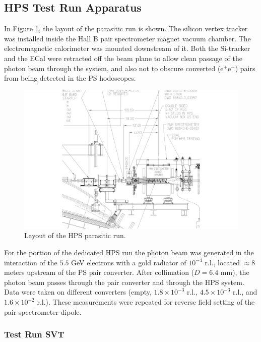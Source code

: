\subsection{HPS Test Run Apparatus } 

In Figure \ref{fig:hpstest_layout}, the layout of the parasitic run is shown. The silicon vertex tracker was installed inside the Hall B pair spectrometer magnet vacuum chamber. The electromagnetic calorimeter was mounted downstream of it.
Both the Si-tracker and the ECal were retracted off the beam plane to allow clean passage of the photon beam through the system, and also not to obscure converted (e$^+$e$^-$) pairs from being detected in the PS hodoscopes.
 
\begin{figure}[ht]
    \includegraphics[width=\textwidth]{test2012/HPS_dimensions}
\caption{\small{Layout of the HPS parasitic run.} }
\label{fig:hpstest_layout}
\end{figure}

For the portion of the dedicated HPS run the photon beam was generated in the interaction of the $5.5$ GeV electrons with a gold radiator of $10^{-4}$ r.l., located $\approx 8$ meters upstream of the PS pair converter. After collimation ($D=6.4$ mm), the photon beam passes through the pair converter and through the HPS system. Data were taken on different converters (empty, $1.8\times 10^{-3}$ r.l., $4.5\times 10^{-3}$ r.l., and $1.6\times 10^{-2}$ r.l.). These measurements were repeated for reverse field setting of the pair spectrometer dipole.


\subsubsection{Test Run SVT}


